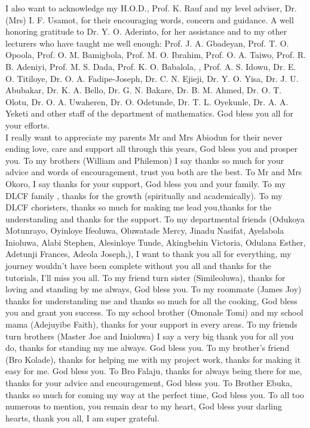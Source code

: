\documentclass[12pt]{report}
\begin{document}
	I also want to acknowledge my H.O.D., Prof. K. Rauf and my level adviser, Dr. (Mrs) I. F. Usamot, for their encouraging words, concern and guidance. A well honoring gratitude to Dr. Y. O. Aderinto, for her assistance and to my other lecturers who have taught me well enough: Prof. J. A. Gbadeyan, Prof. T. O. Opoola, Prof. O. M. Bamigbola, Prof. M. O. Ibrahim, Prof. O. A. Taiwo, Prof. R. B. Adeniyi, Prof. M. S. Dada, Prof. K. O. Babalola, , Prof. A. S. Idowu, Dr. E. O. Titiloye, Dr. O. A. Fadipe-Joseph, Dr. C. N. Ejieji, Dr. Y. O. Yisa, Dr. J. U. Abubakar, Dr. K. A. Bello, Dr. G. N. Bakare, Dr. B. M. Ahmed, Dr. O. T. Olotu, Dr. O. A. Uwaheren, Dr. O. Odetunde, Dr. T. L. Oyekunle, Dr. A. A. Yeketi and other staff of the department of mathematics. God bless you all for your efforts.\\
	I really want to appreciate my parents Mr and Mrs Abiodun for their never ending love, care and support all through this years, God bless you and prosper you. To my brothers (William and Philemon) I say thanks so much for your advice and words of encouragement, trust you both are the best. To Mr and Mrs Okoro, I say thanks for your support, God bless you and your family. To my DLCF family , thanks for the growth (spiritually and academically). To my DLCF choristers, thanks so much for making me lead you,thanks for the understanding and thanks for the support. To my departmental friends (Odukoya Motunrayo, Oyinloye Ifeoluwa, Oluwatade Mercy, Jinadu Nasifat, Ayelabola Inioluwa, Alabi Stephen, Alesinloye Tunde, Akingbehin Victoria, Odulana Esther, Adetunji Frances, Adeola Joseph,), I want to thank you all for everything, my journey wouldn't have been complete without you all and thanks for the tutorials, I'll miss you all. To my friend turn sister (Simileoluwa), thanks for loving and standing by me always, God bless you. To my roommate (James Joy) thanks for understanding me and thanks so much for all the cooking, God bless you and grant you success. To my school brother (Omonale Tomi) and my school mama (Adejuyibe Faith), thanks for your support in every areas. To my friends turn brothers (Master Joe and Inioluwa) I say a very big thank you for all you do, thanks for standing my me always. God bless you. To my brother's friend (Bro Kolade), thanks for helping me with my project work, thanks for making it easy for me. God bless you. To Bro Falaju, thanks for always being there for me, thanks for your advice and encouragement, God bless you. To Brother Ebuka, thanks so much for coming my way at the perfect time, God bless you. To all too numerous to mention, you remain dear to my heart, God bless your darling hearts, thank you all, I am super grateful.
	
\end{document}
